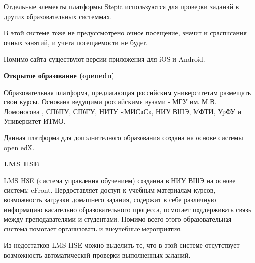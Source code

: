 \documentclass[a4paper,14pt]{article}
\begin{document}
Отдельные элементы платформы Stepic используются для проверки заданий в других образовательных системмах.

В этой системе тоже не предуссмотрено очное посещение, значит и срасписания очных занятий, и учета посещаемости не будет.

Помимо сайта существуют версии приложения для iOS и Android.

\textbf{Открытое образование (openedu)}

Образовательная платформа, предлагающая российским университетам размещать свои курсы. Основана ведущими российскими вузами - МГУ им. М.В. Ломоносова , СПбПУ, СПбГУ, НИТУ «МИСиС», НИУ ВШЭ, МФТИ, УрФУ и Университет ИТМО.

Данная платформа для дополнителного образования создана на основе системы open edX.

\textbf{LMS HSE}

LMS HSE (система управления обучением) созданна в НИУ ВШЭ на основе системы eFront. Пердоставляет доступ к учебным материалам курсов, возможность загрузки домашнего задания, содержит в себе различную информацию касательно образовательного процесса, помогает поддерживать связь между преподавателями и студентами.
Помимо всего этого образовательная система помогает организовать и внеучебные мероприятия. 

Из недостатков LMS HSE можно выделить то, что в этой системе отсутствует возможность автоматической проверки выполненных заланий.




\end{document}
